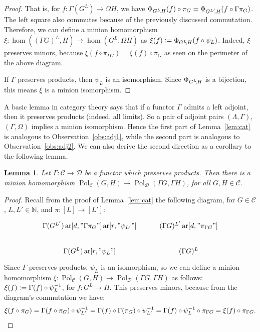 \documentclass[11pt,a4paper]{scrartcl}
\numberwithin{theorem}{section}
\newtheorem{lemma}[theorem]{Lemma}
\theoremstyle{definition}
\newcommand{\NN}{\mathbb{N}}
\newcommand{\defeq}{\vcentcolon=}
\newcommand{\Cc}{\mathcal{C}}
\newcommand{\Dd}{\mathcal{D}}
\DeclareMathOperator{\Pol}{Pol}
\DeclareMathOperator{\ar}{ar}
\begin{document}
\begin{proof}
	\noindent
	That is, for $f\colon \Gamma(G^L) \to \Omega H$, we have $\Phi_{G^L\kern-.2em,H}(f) \circ \pi_G = \Phi_{G^{L'}\kern-.2em,H}(f \circ \Gamma \pi_G)$.
	The left square also commutes because of the previously discussed commutation.
	Therefore, we can define a minion homomorphism $\xi \colon \hom((\Gamma G)^L, H) \to \hom(G^L,   \Omega H)$
	as $\xi(f) \defeq \Phi_{G^L\kern-.2em,H}(f \circ \psi_L)$.
	Indeed, $\xi$ preserves minors, because
	$\xi(f \circ \pi_{\Gamma G}) = \xi(f) \circ \pi_G$ as seen on the perimeter of the above diagram.

	If $\Gamma$ preserves products, then $\psi_L$ is an isomorphism.
	Since $\Phi_{G^L\kern-.2em,H}$ is a bijection, this means $\xi$ is a minion isomorphism.
\end{proof}

A basic lemma in category theory says that if a functor $\Gamma$ admits a left adjoint, then it preserves products (indeed, all limits).
So a pair of adjoint pairs $(\Lambda,\Gamma)$, $(\Gamma,\Omega)$ implies a minion isomorphism.
Hence the first part of Lemma~\ref{lem:cat} is analogous to Observation~\ref{obs:adj1},
while the second part is analogous to Observation~\ref{obs:adj2}.
We can also derive the second direction as a corollary to the following lemma.
\begin{lemma}\label{lem:cat2}
	Let $\Gamma\colon \Cc \to \Dd$ be a functor which preserves products.
	Then there is a minion homomorphism $\Pol_\Cc(G,H) \to \Pol_{\Dd}(\Gamma G, \Gamma H)$, for all $G,H \in \Cc$.
\end{lemma}
\begin{proof}	
	Recall from the proof of Lemma~\ref{lem:cat} the following diagram, for $G \in \Cc$, $L,L' \in \NN$, and $\pi\colon [L] \to [L']$:
	$$\begin{tikzcd}
		\Gamma(G^{L'}) \ar[d, "\Gamma \pi_G"] \ar[r, "\psi_{L'}"] &
		(\Gamma G)^{L'} \ar[d, "\pi_{\Gamma G}"] \\
		\Gamma(G^L) \ar[r, "\psi_L"] &
		(\Gamma G)^L
	\end{tikzcd}$$
	Since $\Gamma$ preserves products, $\psi_L$ is an isomorphism,
	so we can define a minion homomorphism $\xi\colon \Pol_\Cc(G,H) \to \Pol_{\Dd}(\Gamma G, \Gamma H)$ as follows: $\xi(f) \defeq \Gamma(f) \circ \psi_{L}^{-1}$, for $f \colon G^L \to H$.
	This preserves minors, because from the diagram's commutation we have:
	\[\xi(f \circ \pi_G) = \Gamma(f \circ \pi_G) \circ \psi_{L'}^{-1} = \Gamma(f) \circ \Gamma(\pi_G) \circ \psi_{L'}^{-1} =
	\Gamma(f) \circ \psi_L^{-1} \circ \pi_{\Gamma G} = \xi(f) \circ \pi_{\Gamma G}.\vspace*{-\baselineskip}\]
\end{proof}
\end{document}
